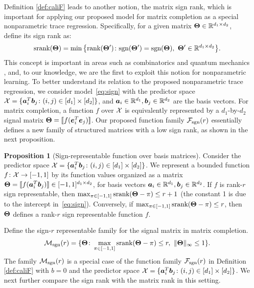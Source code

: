 \documentclass[aos]{imsart}
\theoremstyle{definition}
\newtheorem{proposition}{Proposition}
\def\sign{\textup{sgn}}
\def\srank{\textup{srank}}
\def\rank{\textup{rank}}
\def\caliF{\tF_{\textup{sgn}}}
\def\caliM{\tM_{\textup{sgn}}}
\begin{document}
Definition \ref{def:caliF} leads to another notion, the matrix sign rank, which is important for applying our proposed model for matrix completion as a special nonparametric trace regression. Specifically, for a given matrix $\bm{\Theta}\in\mathbb{R}^{d_1\times d_2}$, define its sign rank as: 
\begin{equation*}
\srank(\mTheta)=\min\big\{ \rank(\mTheta')\colon \sign(\mTheta')=\sign(\mTheta),\  \mTheta'\in\mathbb{R}^{d_1\times d_2} \big\}.
\end{equation*}
This concept is important in areas such as combinatorics \citep{cohn2013fast} and quantum mechanics \citep{de2003nondeterministic}, and, to our knowledge, we are the first to exploit this notion for nonparametric learning. To better understand its relation to the proposed nonparametric trace regression, we consider model~\eqref{eq:sign} with the predictor space $\mathcal{X} = \{\bm{a}^T_i\bm{b}_j\colon (i,j)\in[d_1]\times[d_2]\}$, and $\bm{a}_i\in\mathbb{R}^{d_1}, \bm{b}_j\in\mathbb{R}^{d_2}$ are the basis vectors. For matrix completion, a function $f$ over $\mathcal{X}$ is equivalently represented by a $d_1$-by-$d_2$ signal matrix $\bm{\Theta}=\llbracket f(\bm{e}^T_i\bm{e}_j) \rrbracket$. Our proposed function family $\caliF(r)$ essentially defines a new family of structured matrices with a low sign rank, as shown in the next proposition. 

\begin{proposition}[Sign-representable function over basis matrices]\label{prop:signbasis} Consider the predictor space $\mathcal{X}=\{\bm{a}^T_i\bm{b}_j \colon (i,j)\in[d_1]\times[d_2]\}$. We represent a bounded function $f\colon \mathcal{X}\to [-1,1]$ by its function values organized as a matrix $\bm{\Theta}=\llbracket f(\bm{a}^T_i\bm{b}_j) \rrbracket \in [-1,1]^{d_1\times d_2}$, for basis vectors $\bm{a}_i\in\mathbb{R}^{d_1}, \bm{b}_j\in\mathbb{R}^{d_2}$. If $f$ is rank-$r$ sign representable, then $\max_{\pi\in[-1,1]}\srank(\mTheta-\pi)\leq r+1$ (the constant 1 is due to the intercept in~\eqref{eq:sign}). Conversely, if $\max_{\pi\in[-1,1]}\srank(\mTheta-\pi)\leq r$, then $\bm{\Theta}$ defines a rank-$r$ sign representable function $f$. 
\end{proposition}

Define the sign-$r$ representable family for the signal matrix in matrix completion.  
\begin{align*}
\caliM(r)=\{\mTheta\colon \max_{\pi\in[-1,1]}\srank(\mTheta-\pi)\leq r, \ \mnormSize{}{\mTheta}\leq 1\}.
\end{align*}
The family $\caliM(r)$ is a special case of the function family $\caliF(r)$ in Definition \ref{def:caliF} with $b=0$ and the predictor space $\mathcal{X}=\{\bm{a}_i^T\bm{b}_j\colon (i,j)\in[d_1]\times[d_2]\}$. We next further compare the sign rank with the matrix rank in this setting. 
\end{document}
